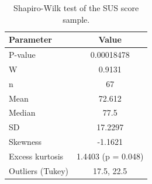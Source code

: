 \begin{table}[tbp]
\centering
\begin{tabular}{lc}
\toprule
Parameter & Value \\ \midrule
P-value & 0.00018478 \\
W & 0.9131 \\
n & 67 \\
Mean & 72.612 \\
Median & 77.5 \\
SD & 17.2297 \\
Skewness & -1.1621 \\
Excess kurtosis & 1.4403 (p = 0.048) \\
Outliers (Tukey) & 17.5, 22.5 \\
\bottomrule
\end{tabular}
\caption{Shapiro-Wilk test of the SUS score sample.}
\label{tab:sus-shapiro-wilk}
\end{table}
